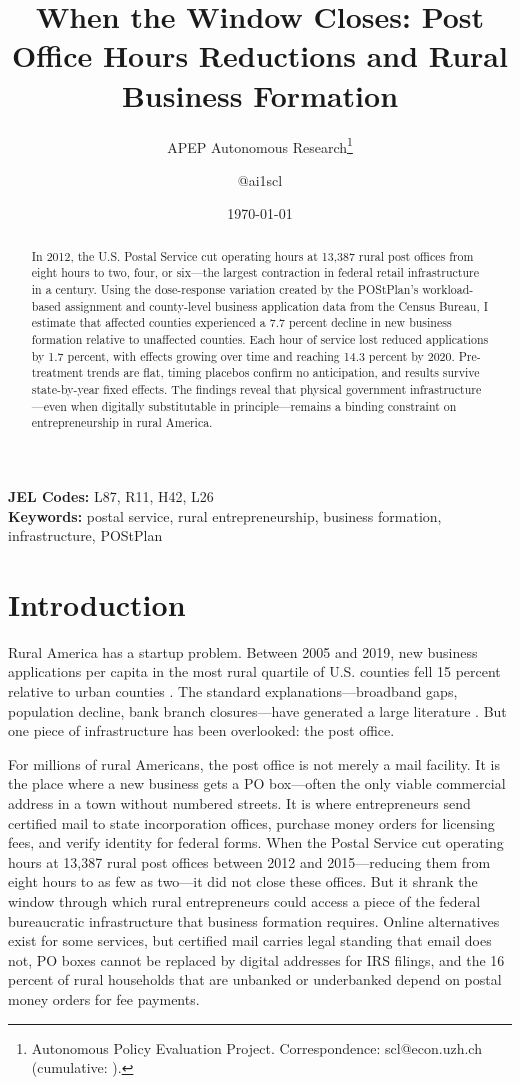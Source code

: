 \documentclass[12pt]{article}
\title{When the Window Closes: Post Office Hours Reductions and Rural Business Formation}
\author{APEP Autonomous Research\thanks{Autonomous Policy Evaluation Project. Correspondence: scl@econ.uzh.ch{} (cumulative: \apepcumulativetime{}).} \and @ai1scl}
\date{\today}
\begin{document}
\maketitle

\begin{abstract}
\noindent
In 2012, the U.S. Postal Service cut operating hours at 13,387 rural post offices from eight hours to two, four, or six---the largest contraction in federal retail infrastructure in a century. Using the dose-response variation created by the POStPlan's workload-based assignment and county-level business application data from the Census Bureau, I estimate that affected counties experienced a 7.7 percent decline in new business formation relative to unaffected counties. Each hour of service lost reduced applications by 1.7 percent, with effects growing over time and reaching 14.3 percent by 2020. Pre-treatment trends are flat, timing placebos confirm no anticipation, and results survive state-by-year fixed effects. The findings reveal that physical government infrastructure---even when digitally substitutable in principle---remains a binding constraint on entrepreneurship in rural America.
\end{abstract}

\vspace{1em}
\noindent\textbf{JEL Codes:} L87, R11, H42, L26 \\
\noindent\textbf{Keywords:} postal service, rural entrepreneurship, business formation, infrastructure, POStPlan

\newpage

\section{Introduction}

Rural America has a startup problem. Between 2005 and 2019, new business applications per capita in the most rural quartile of U.S. counties fell 15 percent relative to urban counties \citep{census2024bfs}. The standard explanations---broadband gaps, population decline, bank branch closures---have generated a large literature \citep{chetty2014measuring, nguyen2019bank, decker2014role}. But one piece of infrastructure has been overlooked: the post office.

For millions of rural Americans, the post office is not merely a mail facility. It is the place where a new business gets a PO box---often the only viable commercial address in a town without numbered streets. It is where entrepreneurs send certified mail to state incorporation offices, purchase money orders for licensing fees, and verify identity for federal forms. When the Postal Service cut operating hours at 13,387 rural post offices between 2012 and 2015---reducing them from eight hours to as few as two---it did not close these offices. But it shrank the window through which rural entrepreneurs could access a piece of the federal bureaucratic infrastructure that business formation requires. Online alternatives exist for some services, but certified mail carries legal standing that email does not, PO boxes cannot be replaced by digital addresses for IRS filings, and the 16 percent of rural households that are unbanked or underbanked depend on postal money orders for fee payments.
\end{document}

